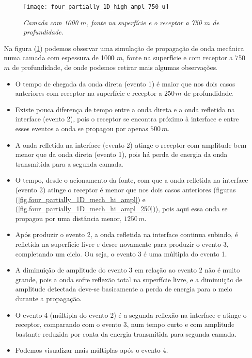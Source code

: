 \begin{figure}
\centering
\texttt{[image: four\_partially\_1D\_high\_ampl\_750\_u]}\\
\caption{\textit{Camada com 1000 $m$, fonte na superf\'icie e o receptor a 750 $m$ de profundidade.}}
\label{fig.four_partially_1D_mech_hi_ampl_750}
\end{figure}

Na figura (\ref{fig.four_partially_1D_mech_hi_ampl_750}) podemos observar uma simula\c{c}\~ao de propaga\c{c}\~ao de onda mec\^anica numa camada com espessura de 1000 $m$, fonte na superf\'icie e com receptor a 750 $m$ de profundidade, de onde podemos retirar mais algumas observa\c{c}\~oes.

\begin{itemize}
\item O tempo de chegada da onda direta (evento 1) \'e maior que nos dois casos anteriores com receptor na superf\'icie e receptor a $250\,m$ de profundidade. 
\item  Existe pouca diferen\c{c}a de tempo entre a onda direta e a onda refletida na interface (evento 2), pois o receptor se encontra pr\'oximo \`a interface e entre esses eventos a onda se propagou por apenas $500\,m$.
\item A onda refletida na interface (evento 2) atinge o receptor com amplitude bem menor que da onda direta (evento 1), pois h\'a perda de energia da onda transmitida para a segunda camada.
\item O tempo, desde o acionamento da fonte, com que a onda refletida na interface (evento 2) atinge o receptor \'e menor que nos dois casos anteriores (figuras (\ref{fig.four_partially_1D_mech_hi_ampl}) e (\ref{fig.four_partially_1D_mech_hi_ampl_250})), pois aqui essa onda se propagou por uma dist\^ancia menor, $1250\,m$.
\item Ap\'os produzir o evento 2, a onda refletida na interface continua subindo, \'e refletida na superf\'icie livre e desce novamente para produzir o evento 3, completando um ciclo. Ou seja, o evento 3 \'e uma m\'ultipla do evento 1.
\item A diminui\c{c}\~ao de amplitude do evento 3 em rela\c{c}\~ao ao evento 2 n\~ao \'e muito grande, pois a onda sofre reflex\~ao total na superf\'icie livre, e a diminui\c{c}\~ao de amplitude detectada deve-se basicamente a perda de energia para o meio durante a propaga\c{c}\~ao.
\item O evento 4 (m\'ultipla do evento 2) \'e a segunda reflex\~ao na interface e atinge o receptor, comparando com o evento 3, num tempo curto e com amplitude bastante reduzida por conta da energia transmitida para segunda camada.
\item Podemos visualizar mais m\'ultiplas ap\'os o evento 4.
\end{itemize}

